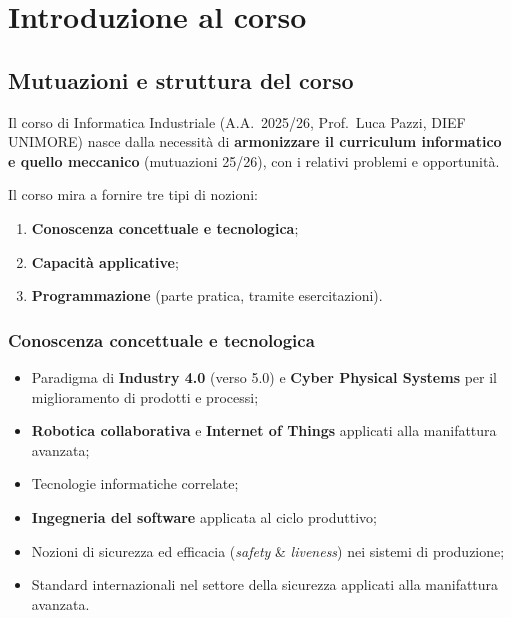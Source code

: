 \chapter{Introduzione al corso}
\label{cap:introduzione}

\section{Mutuazioni e struttura del corso}
Il corso di Informatica Industriale (A.A.\ 2025/26, Prof.\ Luca Pazzi, DIEF UNIMORE) nasce dalla necessità di \textbf{armonizzare il curriculum informatico e quello meccanico} (mutuazioni 25/26), con i relativi problemi e opportunità.

Il corso mira a fornire tre tipi di nozioni:
\begin{enumerate}
    \item \textbf{Conoscenza concettuale e tecnologica};
    \item \textbf{Capacità applicative};
    \item \textbf{Programmazione} (parte pratica, tramite esercitazioni).
\end{enumerate}

\subsection{Conoscenza concettuale e tecnologica}
\begin{itemize}
    \item Paradigma di \textbf{Industry 4.0} (verso 5.0) e \textbf{Cyber Physical Systems} per il miglioramento di prodotti e processi;
    \item \textbf{Robotica collaborativa} e \textbf{Internet of Things} applicati alla manifattura avanzata;
    \item Tecnologie informatiche correlate;
    \item \textbf{Ingegneria del software} applicata al ciclo produttivo;
    \item Nozioni di sicurezza ed efficacia (\emph{safety} \& \emph{liveness}) nei sistemi di produzione;
    \item Standard internazionali nel settore della sicurezza applicati alla manifattura avanzata.
\end{itemize}


